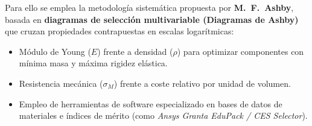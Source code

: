Para ello se emplea la metodología sistemática propuesta por \textbf{M.~F.~Ashby}, basada en \textbf{diagramas de selección multivariable (Diagramas de Ashby)} que cruzan propiedades contrapuestas en escalas logarítmicas:
\begin{itemize}
    \item Módulo de Young ($E$) frente a densidad ($\rho$) para optimizar componentes con mínima masa y máxima rigidez elástica.
    \item Resistencia mecánica ($\sigma_M$) frente a coste relativo por unidad de volumen.
    \item Empleo de herramientas de software especializado en bases de datos de materiales e índices de mérito (como \textit{Ansys Granta EduPack / CES Selector}).
\end{itemize}
